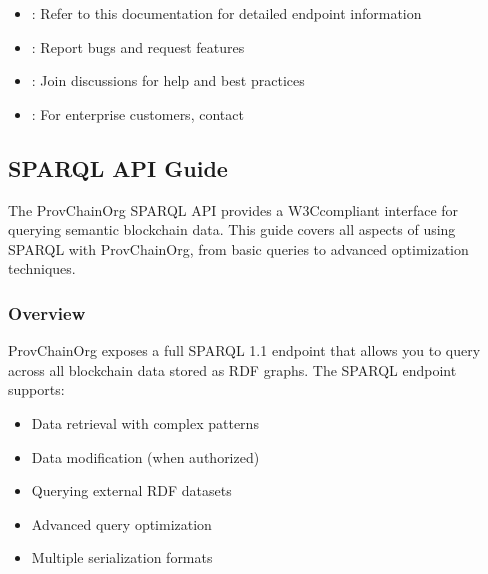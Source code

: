 \documentclass[letterpaper,10pt,english]{sphinxmanual}
\begin{document}
\begin{itemize}
\item {} 
\sphinxAtStartPar
{}: Refer to this documentation for detailed endpoint information

\item {} 
\sphinxAtStartPar
{}: Report bugs and request features

\item {} 
\sphinxAtStartPar
{}: Join discussions for help and best practices

\item {} 
\sphinxAtStartPar
{}: For enterprise customers, contact 

\end{itemize}

\sphinxstepscope


\subsection{SPARQL API Guide}
\label{\detokenize{api/sparql-api:sparql-api-guide}}\label{\detokenize{api/sparql-api::doc}}
\sphinxAtStartPar
The ProvChainOrg SPARQL API provides a W3C\sphinxhyphen{}compliant interface for querying semantic blockchain data. This guide covers all aspects of using SPARQL with ProvChainOrg, from basic queries to advanced optimization techniques.


\subsubsection{Overview}
\label{\detokenize{api/sparql-api:overview}}
\sphinxAtStartPar
ProvChainOrg exposes a full SPARQL 1.1 endpoint that allows you to query across all blockchain data stored as RDF graphs. The SPARQL endpoint supports:
\begin{itemize}
\item {} 
\sphinxAtStartPar
{} \sphinxhyphen{} Data retrieval with complex patterns

\item {} 
\sphinxAtStartPar
{} \sphinxhyphen{} Data modification (when authorized)

\item {} 
\sphinxAtStartPar
{} \sphinxhyphen{} Querying external RDF datasets

\item {} 
\sphinxAtStartPar
{} \sphinxhyphen{} Advanced query optimization

\item {} 
\sphinxAtStartPar
{} \sphinxhyphen{} Multiple serialization formats

\end{itemize}
\end{document}
